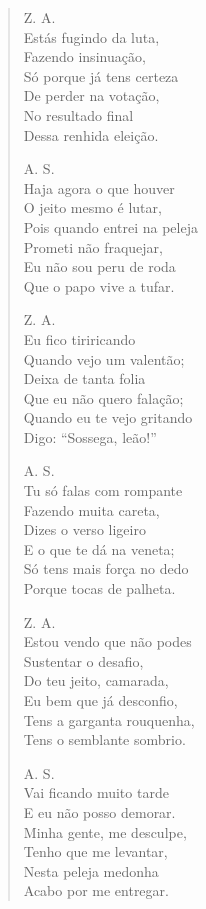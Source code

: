 \begin{verse}
Z. A.\\
Estás fugindo da luta,\\
Fazendo insinuação,\\
Só porque já tens certeza\\
De perder na votação,\\
No resultado final\\
Dessa renhida eleição.

A. S.\\
Haja agora o que houver\\
O jeito mesmo é lutar,\\
Pois quando entrei na peleja\\
Prometi não fraquejar,\\
Eu não sou peru de roda\\
Que o papo vive a tufar.
\pagebreak

Z. A.\\
Eu fico tiriricando\\
Quando vejo um valentão;\\
Deixa de tanta folia\\
Que eu não quero falação;\\
Quando eu te vejo gritando\\
Digo: “Sossega, leão!”

A. S.\\
Tu só falas com rompante\\
Fazendo muita careta,\\
Dizes o verso ligeiro\\
E o que te dá na veneta;\\
Só tens mais força no dedo\\
Porque tocas de palheta.

Z. A.\\
Estou vendo que não podes\\
Sustentar o desafio,\\
Do teu jeito, camarada,\\
Eu bem que já desconfio,\\
Tens a garganta rouquenha,\\
Tens o semblante sombrio.

A. S.\\
Vai ficando muito tarde\\
E eu não posso demorar.\\
Minha gente, me desculpe,\\
Tenho que me levantar,\\
Nesta peleja medonha\\
Acabo por me entregar.
\pagebreak


\end{verse}
